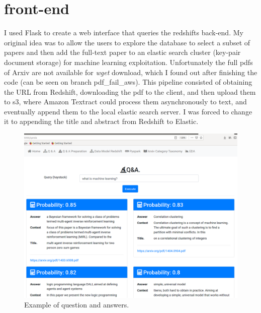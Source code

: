 \section{front-end}
I used Flask to create a web interface that queries the redshifts back-end. My original idea was to allow the users to explore the database to select a subset of papers and then add the full-text paper to an elastic search cluster (key-pair document storage) for machine learning exploitation. Unfortunately the full pdfs of Arxiv are not available for \emph{wget} download, which I found out after finishing the code (can be seen on branch pdf\_fail\_aws). This pipeline consisted of obtaining the URL from Redshift, downloading the pdf to the client, and then upload them to s3, where Amazon Textract could process them asynchronously to text, and eventually append them to the local elastic search server. I was forced to change it to appending the title and abstract from Redshift to Elastic.


\begin{figure}
\centering
\includegraphics[width=0.9\linewidth]{images/3_make_questions}
\caption{Example of question and answers.}
\label{fig:3_make_questions}
\end{figure}


